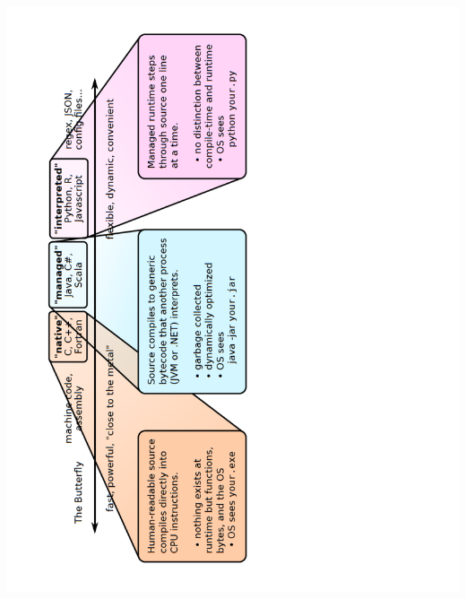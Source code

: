 \documentclass[10pt, t]{beamer}
\let\texttt=\graytt
\begin{document}
\begin{frame}{} %
\begin{columns}
\includegraphics[angle=-90,width=\linewidth]{figures/languages2.pdf}
\end{columns}
\end{frame}

\end{document}

